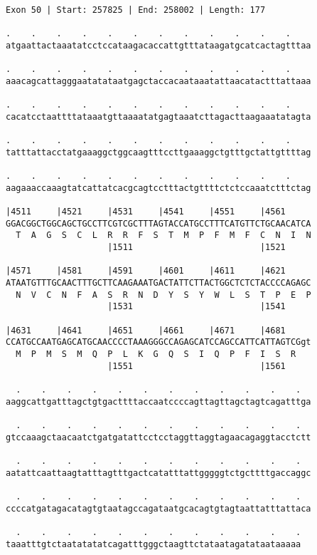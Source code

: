\documentclass{article}
\begin{document}
\newpage
\begin{Verbatim}
Exon 50 | Start: 257825 | End: 258002 | Length: 177
 
.    .    .    .    .    .    .    .    .    .    .    .    
atgaattactaaatatcctccataagacaccattgtttataagatgcatcactagtttaa
  
.    .    .    .    .    .    .    .    .    .    .    .    
aaacagcattagggaatatataatgagctaccacaataaatattaacatactttattaaa
  
.    .    .    .    .    .    .    .    .    .    .    .    
cacatcctaattttataaatgttaaaatatgagtaaatcttagacttaagaaatatagta
  
.    .    .    .    .    .    .    .    .    .    .    .    
tatttattacctatgaaaggctggcaagtttccttgaaaggctgtttgctattgttttag
  
.    .    .    .    .    .    .    .    .    .    .    .    
aagaaaccaaagtatcattatcacgcagtcctttactgttttctctccaaatctttctag
  
|4511     |4521     |4531     |4541     |4551     |4561     
GGACGGCTGGCAGCTGCCTTCGTCGCTTTAGTACCATGCCTTTCATGTTCTGCAACATCA
  T  A  G  S  C  L  R  R  F  S  T  M  P  F  M  F  C  N  I  N
                    |1511                         |1521     
  
|4571     |4581     |4591     |4601     |4611     |4621     
ATAATGTTTGCAACTTTGCTTCAAGAAATGACTATTCTTACTGGCTCTCTACCCCAGAGC
  N  V  C  N  F  A  S  R  N  D  Y  S  Y  W  L  S  T  P  E  P
                    |1531                         |1541     
  
|4631     |4641     |4651     |4661     |4671     |4681     
CCATGCCAATGAGCATGCAACCCCTAAAGGGCCAGAGCATCCAGCCATTCATTAGTCGgt
  M  P  M  S  M  Q  P  L  K  G  Q  S  I  Q  P  F  I  S  R   
                    |1551                         |1561     
  
  .    .    .    .    .    .    .    .    .    .    .    .  
aaggcattgatttagctgtgacttttaccaatccccagttagttagctagtcagatttga
  
  .    .    .    .    .    .    .    .    .    .    .    .  
gtccaaagctaacaatctgatgatattcctcctaggttaggtagaacagaggtacctctt
  
  .    .    .    .    .    .    .    .    .    .    .    .  
aatattcaattaagtatttagtttgactcatatttattgggggtctgcttttgaccaggc
  
  .    .    .    .    .    .    .    .    .    .    .    .  
ccccatgatagacatagtgtaatagccagataatgcacagtgtagtaattatttattaca
  
  .    .    .    .    .    .    .    .    .    .    .    .
taaatttgtctaatatatatcagatttgggctaagttctataatagatataataaaaa
\end{Verbatim}
\end{document}
